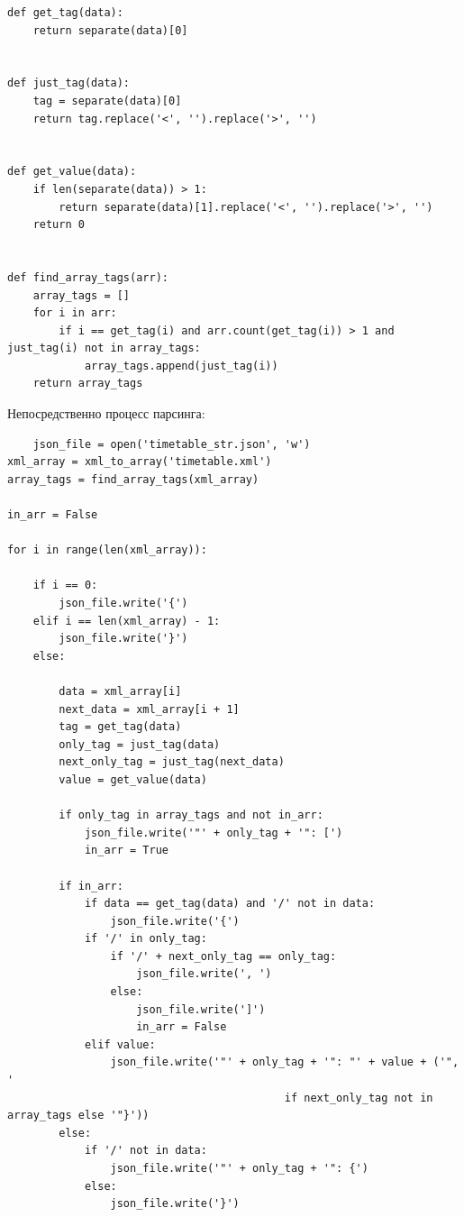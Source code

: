 \documentclass[12pt]{article}
\begin{document}
\newpage

\begin{verbatim}
def get_tag(data):
    return separate(data)[0]


def just_tag(data):
    tag = separate(data)[0]
    return tag.replace('<', '').replace('>', '')


def get_value(data):
    if len(separate(data)) > 1:
        return separate(data)[1].replace('<', '').replace('>', '')
    return 0


def find_array_tags(arr):
    array_tags = []
    for i in arr:
        if i == get_tag(i) and arr.count(get_tag(i)) > 1 and just_tag(i) not in array_tags:
            array_tags.append(just_tag(i))
    return array_tags
\end{verbatim}

\newpage

Непосредственно процесс парсинга:

\begin{verbatim}
    json_file = open('timetable_str.json', 'w')
xml_array = xml_to_array('timetable.xml')
array_tags = find_array_tags(xml_array)

in_arr = False

for i in range(len(xml_array)):

    if i == 0:
        json_file.write('{')
    elif i == len(xml_array) - 1:
        json_file.write('}')
    else:

        data = xml_array[i]
        next_data = xml_array[i + 1]
        tag = get_tag(data)
        only_tag = just_tag(data)
        next_only_tag = just_tag(next_data)
        value = get_value(data)

        if only_tag in array_tags and not in_arr:
            json_file.write('"' + only_tag + '": [')
            in_arr = True

        if in_arr:
            if data == get_tag(data) and '/' not in data:
                json_file.write('{')
            if '/' in only_tag:
                if '/' + next_only_tag == only_tag:
                    json_file.write(', ')
                else:
                    json_file.write(']')
                    in_arr = False
            elif value:
                json_file.write('"' + only_tag + '": "' + value + ('", ' 
                                           if next_only_tag not in array_tags else '"}'))
        else:
            if '/' not in data:
                json_file.write('"' + only_tag + '": {')
            else:
                json_file.write('}')
\end{verbatim}
\end{document}
